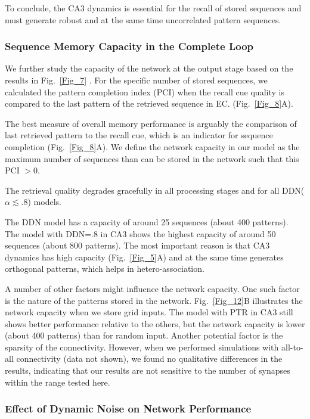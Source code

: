 \documentclass[utf8]{frontiersSCNS} %
\begin{document}
To conclude, the CA3 dynamics is essential for the recall of stored sequences and must generate robust and at the same time uncorrelated pattern sequences.          

\subsubsection{Sequence Memory Capacity in the Complete Loop}

We further study the capacity of the network at the output stage based on the results in Fig.~\ref{Fig_7} . For the specific number of stored sequences, we calculated the pattern completion index (PCI) when the recall cue quality is compared to the last pattern of the retrieved sequence in EC. (Fig.~\ref{Fig_8}A).


The best measure of overall memory performance is arguably the comparison of last retrieved pattern to the recall cue, which is an indicator for sequence completion (Fig.~\ref{Fig_8}A). We define the network capacity in our model as the maximum number of sequences than can be stored in the network such that this PCI $> 0$.

The retrieval quality degrades gracefully in all processing stages and for all DDN($\alpha \lesssim .8$)  models. 


The DDN model has a capacity of around 25 sequences (about 400 patterns). The model with DDN=.8 in CA3 shows the highest capacity of around 50 sequences (about 800 patterns). The most important reason is that CA3 dynamics has high capacity (Fig.~\ref{Fig_5}A) and at the same time generates orthogonal patterns, which helps in hetero-association.  

A number of other factors might influence the network capacity. One such factor is the nature of the patterns stored in the network. Fig.~\ref{Fig_12}B illustrates the network capacity when we store grid inputs. The model with PTR in CA3 still shows better performance relative to the others, but the network capacity is lower (about 400 patterns) than for random input. Another potential factor is the sparsity of the connectivity. However, when we performed simulations with all-to-all connectivity (data not shown), we found no qualitative differences in the results, indicating that our results are not sensitive to the number of synapses within the range tested here. 

\subsubsection{Effect of Dynamic Noise on Network Performance}
\end{document}
